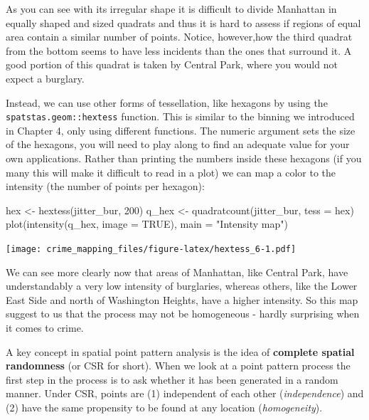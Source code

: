 \documentclass[
  krantz2]{krantz}
\makeatletter
\newenvironment{Shaded}{\begin{snugshade}}{\end{snugshade}}
\newcommand{\AttributeTok}[1]{\textcolor[rgb]{0.61,0.61,0.61}{#1}}
\newcommand{\ConstantTok}[1]{\textcolor[rgb]{0,0,0}{#1}}
\newcommand{\DecValTok}[1]{\textcolor[rgb]{0.06,0.06,0.06}{#1}}
\newcommand{\FunctionTok}[1]{\textcolor[rgb]{0,0,0}{#1}}
\newcommand{\NormalTok}[1]{#1}
\newcommand{\OtherTok}[1]{\textcolor[rgb]{0.37,0.37,0.37}{#1}}
\newcommand{\StringTok}[1]{\textcolor[rgb]{0.5,0.5,0.5}{#1}}
\newenvironment{kframe}{%
\medskip{}
\setlength{\fboxsep}{.8em}
 \def\at@end@of@kframe{}%
 \ifinner\ifhmode%
  \def\at@end@of@kframe{\end{minipage}}%
  \begin{minipage}{\columnwidth}%
 \fi\fi%
 \def\FrameCommand##1{\hskip\@totalleftmargin \hskip-\fboxsep
 \colorbox{shadecolor}{##1}\hskip-\fboxsep
     \hskip-\linewidth \hskip-\@totalleftmargin \hskip\columnwidth}%
 \MakeFramed {\advance\hsize-\width
   \@totalleftmargin\z@ \linewidth\hsize
   \@setminipage}}%
 {\par\unskip\endMakeFramed%
 \at@end@of@kframe}
\renewenvironment{Shaded}{\begin{kframe}}{\end{kframe}}
\makeatother
\begin{document}
As you can see with its irregular shape it is difficult to divide Manhattan in equally shaped and sized quadrats and thus it is hard to assess if regions of equal area contain a similar number of points. Notice, however,how the third quadrat from the bottom seems to have less incidents than the ones that surround it. A good portion of this quadrat is taken by Central Park, where you would not expect a burglary.

Instead, we can use other forms of tessellation, like hexagons by using the \texttt{spatstas.geom::hextess} function. This is similar to the binning we introduced in Chapter 4, only using different functions. The numeric argument sets the size of the hexagons, you will need to play along to find an adequate value for your own applications. Rather than printing the numbers inside these hexagons (if you many this will make it difficult to read in a plot) we can map a color to the intensity (the number of points per hexagon):

\begin{Shaded}
\begin{Highlighting}[]
\NormalTok{hex }\OtherTok{\textless{}{-}} \FunctionTok{hextess}\NormalTok{(jitter\_bur, }\DecValTok{200}\NormalTok{)}
\NormalTok{q\_hex }\OtherTok{\textless{}{-}} \FunctionTok{quadratcount}\NormalTok{(jitter\_bur, }\AttributeTok{tess =}\NormalTok{ hex)}
\FunctionTok{plot}\NormalTok{(}\FunctionTok{intensity}\NormalTok{(q\_hex, }\AttributeTok{image =} \ConstantTok{TRUE}\NormalTok{), }\AttributeTok{main =} \StringTok{"Intensity map"}\NormalTok{)}
\end{Highlighting}
\end{Shaded}

\texttt{[image: crime\_mapping\_files/figure-latex/hextess\_6-1.pdf]}

We can see more clearly now that areas of Manhattan, like Central Park, have understandably a very low intensity of burglaries, whereas others, like the Lower East Side and north of Washington Heights, have a higher intensity. So this map suggest to us that the process may not be homogeneous - hardly surprising when it comes to crime.

A key concept in spatial point pattern analysis is the idea of \textbf{complete spatial randomness} (or CSR for short). When we look at a point pattern process the first step in the process is to ask whether it has been generated in a random manner. Under CSR, points are (1) independent of each other (\emph{independence}) and (2) have the same propensity to be found at any location (\emph{homogeneity}).
\end{document}
